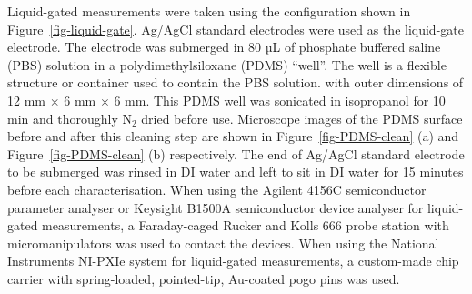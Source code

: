 \documentclass[
  a4paper,
]{scrbook}
\begin{document}
Liquid-gated measurements were taken using the configuration shown in
Figure~\ref{fig-liquid-gate}. Ag/AgCl standard electrodes were used as
the liquid-gate electrode. The electrode was submerged in 80 µL of
phosphate buffered saline (PBS) solution in a polydimethylsiloxane
(PDMS) ``well''. The well is a flexible structure or container used to
contain the PBS solution. with outer dimensions of 12 mm \(\times\) 6 mm
\(\times\) 6 mm. This PDMS well was sonicated in isopropanol for 10 min
and thoroughly N\(_2\) dried before use. Microscope images of the PDMS
surface before and after this cleaning step are shown in
Figure~\ref{fig-PDMS-clean} (a) and Figure~\ref{fig-PDMS-clean} (b)
respectively. The end of Ag/AgCl standard electrode to be submerged was
rinsed in DI water and left to sit in DI water for 15 minutes before
each characterisation. When using the Agilent 4156C semiconductor
parameter analyser or Keysight B1500A semiconductor device analyser for
liquid-gated measurements, a Faraday-caged Rucker and Kolls 666 probe
station with micromanipulators was used to contact the devices. When
using the National Instruments NI-PXIe system for liquid-gated
measurements, a custom-made chip carrier with spring-loaded,
pointed-tip, Au-coated pogo pins was used.
\end{document}
